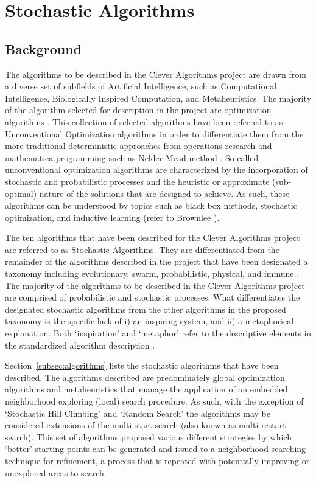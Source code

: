 \documentclass[a4paper, 11pt]{article}
\begin{document}
% 
% 
\section{Stochastic Algorithms}
\label{sec:algorithms}

% 
% 
\subsection{Background}
The algorithms to be described in the Clever Algorithms project are drawn from a diverse set of subfields of Artificial Intelligence, such as Computational Intelligence, Biologically Inspired Computation, and Metaheuristics. The majority of the algorithm selected for description in the project are optimization algorithms \cite{Brownlee2010b}. 
This collection of selected algorithms have been referred to as Unconventional Optimization algorithms in order to differentiate them from the more traditional deterministic approaches from operations research and mathematica programming such as Nelder-Mead method \cite{Brownlee2010n}. So-called unconventional optimization algorithms are characterized by the incorporation of stochastic and probabilistic processes and the heuristic or approximate (sub-optimal) nature of the solutions that are designed to achieve. As such, these algorithms can be understood by topics such as black box methods, stochastic optimization, and inductive learning (refer to Brownlee \cite{Brownlee2010n}). 

The ten algorithms that have been described for the Clever Algorithms project are referred to as Stochastic Algorithms. They are differentiated from the remainder of the algorithms described in the project that have been designated a taxonomy including evolutionary, swarm, probabilistic, physical, and immune \cite{Brownlee2010b}. 
The majority of the algorithms to be described in the Clever Algorithms project are comprised of probabilistic and stochastic processes. What differentiates the designated stochastic algorithms from the other algorithms in the proposed taxonomy is the specific lack of i) an inspiring system, and ii) a metaphorical explanation. Both `inspiration' and `metaphor' refer to the descriptive elements in the standardized algorithm description \cite{Brownlee2010a}.

Section~\ref{subsec:algorithms} lists the stochastic algorithms that have been described. The algorithms described are predominately global optimization algorithms and metaheuristics that manage the application of an embedded neighborhood exploring (local) search procedure. As such, with the exception of `Stochastic Hill Climbing' and `Random Search' the algorithms may be considered extensions of the multi-start search (also known as multi-restart search). This set of algorithms proposed various different strategies by which `better' starting points can be generated and issued to a neighborhood searching technique for refinement, a process that is repeated with potentially improving or unexplored areas to search. 
\end{document}
